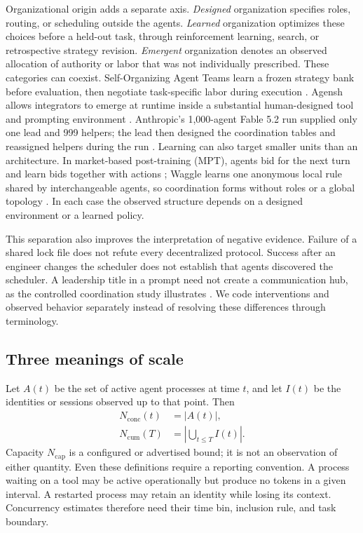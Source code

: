 Organizational origin adds a separate axis. \emph{Designed} organization specifies roles, routing, or scheduling outside the agents. \emph{Learned} organization optimizes these choices before a held-out task, through reinforcement learning, search, or retrospective strategy revision. \emph{Emergent} organization denotes an observed allocation of authority or labor that was not individually prescribed. These categories can coexist. Self-Organizing Agent Teams learn a frozen strategy bank before evaluation, then negotiate task-specific labor during execution \citep{sat-teams}. Agensh allows integrators to emerge at runtime inside a substantial human-designed tool and prompting environment \citep{agensh-1024}. Anthropic's 1,000-agent Fable 5.2 run supplied only one lead and 999 helpers; the lead then designed the coordination tables and reassigned helpers during the run \citep{anthropic-fable-team-scaling}. Learning can also target smaller units than an architecture. In market-based post-training (MPT), agents bid for the next turn and learn bids together with actions \citep{mpt-self-orchestration}; Waggle learns one anonymous local rule shared by interchangeable agents, so coordination forms without roles or a global topology \citep{waggle-2026}. In each case the observed structure depends on a designed environment or a learned policy.

This separation also improves the interpretation of negative evidence. Failure of a shared lock file does not refute every decentralized protocol. Success after an engineer changes the scheduler does not establish that agents discovered the scheduler. A leadership title in a prompt need not create a communication hub, as the controlled coordination study illustrates \citep{when-agents-coordinate}. We code interventions and observed behavior separately instead of resolving these differences through terminology.

\subsection{Three meanings of scale}
Let $A(t)$ be the set of active agent processes at time $t$, and let $I(t)$ be the identities or sessions observed up to that point. Then
\begin{align}
N_{\mathrm{conc}}(t)&=|A(t)|,\\
N_{\mathrm{cum}}(T)&=\left|\bigcup_{t\leq T} I(t)\right|.
\end{align}
Capacity $N_{\mathrm{cap}}$ is a configured or advertised bound; it is not an observation of either quantity. Even these definitions require a reporting convention. A process waiting on a tool may be active operationally but produce no tokens in a given interval. A restarted process may retain an identity while losing its context. Concurrency estimates therefore need their time bin, inclusion rule, and task boundary.

